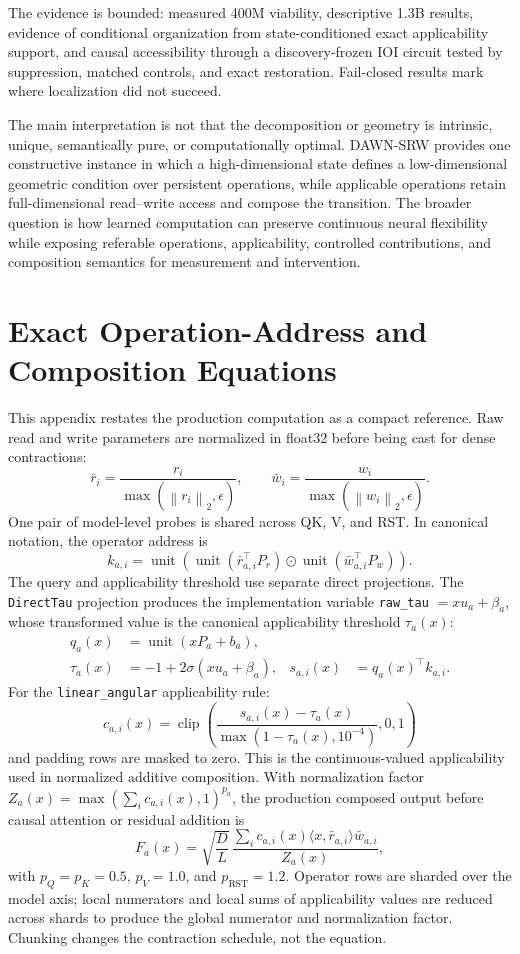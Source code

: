 \documentclass{article}
\newcommand{\norm}[1]{\left\lVert #1 \right\rVert}
\newcommand{\od}{\mathbin{\odot}}
\newcommand{\DAWN}{DAWN-SRW}
\begin{document}
The evidence is bounded: measured 400M viability, descriptive 1.3B results,
evidence of conditional organization from state-conditioned exact applicability
support, and causal accessibility through a
discovery-frozen IOI circuit tested by suppression, matched controls, and exact
restoration. Fail-closed results mark where localization did not succeed.

The main interpretation is not that the decomposition or geometry is intrinsic,
unique, semantically pure, or computationally optimal. \DAWN{} provides one
constructive instance in which a high-dimensional state defines a low-dimensional
geometric condition over persistent operations, while applicable operations retain
full-dimensional read--write access and compose the transition. The broader
question is how learned computation can preserve continuous neural flexibility
while exposing referable operations, applicability, controlled contributions,
and composition semantics for measurement and intervention.

\clearpage
\appendix

\section{Exact Operation-Address and Composition Equations}
\label{app:equations}

This appendix restates the production computation as a compact reference. Raw
read and write parameters are normalized in float32 before being cast for
dense contractions:
\[
\bar r_i=\frac{r_i}{\max(\norm{r_i}_2,\epsilon)},\qquad
\bar w_i=\frac{w_i}{\max(\norm{w_i}_2,\epsilon)}.
\]
One pair of model-level probes is shared across QK, V, and RST. In canonical
notation, the operator address is
\[
k_{a,i}=\operatorname{unit}\!\left(
\operatorname{unit}(\bar r_{a,i}^{\top}P_r)\od
\operatorname{unit}(\bar w_{a,i}^{\top}P_w)\right).
\]
The query and applicability threshold use separate direct projections. The
\texttt{DirectTau} projection produces the implementation variable
\texttt{raw\_tau} \(=xu_a+\beta_a\), whose transformed value is the canonical
applicability threshold \(\tau_a(x)\):
\[
\begin{aligned}
q_a(x)&=\operatorname{unit}(xP_a+b_a),\\
\tau_a(x)&=-1+2\sigma(xu_a+\beta_a),&
s_{a,i}(x)&=q_a(x)^\top k_{a,i}.
\end{aligned}
\]
For the \texttt{linear\_angular} applicability rule:
\[
c_{a,i}(x)=
\operatorname{clip}\!\left(
\frac{s_{a,i}(x)-\tau_a(x)}{\max(1-\tau_a(x),10^{-4})},0,1\right)
\]
and padding rows are masked to zero. This is the continuous-valued applicability
used in normalized additive composition. With normalization factor
\(Z_a(x)=\max(\sum_i c_{a,i}(x),1)^{p_a}\), the production composed output
before causal attention or residual addition is
\[
F_a(x)=
\sqrt{\frac{D}{L}}\,
\frac{\sum_i c_{a,i}(x)\langle x,\bar r_{a,i}\rangle\bar w_{a,i}}
{Z_a(x)},
\]
with \(p_Q=p_K=0.5\), \(p_V=1.0\), and \(p_{\mathrm{RST}}=1.2\).
Operator rows are sharded over the model axis; local numerators and local sums of
applicability values are reduced across shards to produce the global numerator
and normalization factor. Chunking changes the contraction schedule, not the
equation.
\end{document}
